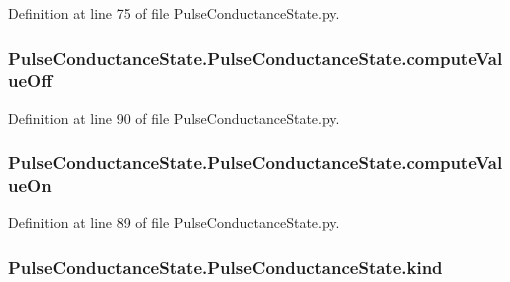 Definition at line 75 of file Pulse\-Conductance\-State.\-py.

\hypertarget{class_pulse_conductance_state_1_1_pulse_conductance_state_a89e0cc154bd699aee7529574a8fe556c}{
\subsubsection[{compute\-Value\-Off}]{\setlength{\rightskip}{0pt plus 5cm}Pulse\-Conductance\-State.\-Pulse\-Conductance\-State.\-compute\-Value\-Off}}\label{class_pulse_conductance_state_1_1_pulse_conductance_state_a89e0cc154bd699aee7529574a8fe556c}


Definition at line 90 of file Pulse\-Conductance\-State.\-py.

\hypertarget{class_pulse_conductance_state_1_1_pulse_conductance_state_a7f6710b9f97ac5879888402cd5ed15d4}{
\subsubsection[{compute\-Value\-On}]{\setlength{\rightskip}{0pt plus 5cm}Pulse\-Conductance\-State.\-Pulse\-Conductance\-State.\-compute\-Value\-On}}\label{class_pulse_conductance_state_1_1_pulse_conductance_state_a7f6710b9f97ac5879888402cd5ed15d4}


Definition at line 89 of file Pulse\-Conductance\-State.\-py.

\hypertarget{class_pulse_conductance_state_1_1_pulse_conductance_state_a53d237daaa4815ad375e2377da89845e}{
\subsubsection[{kind}]{\setlength{\rightskip}{0pt plus 5cm}Pulse\-Conductance\-State.\-Pulse\-Conductance\-State.\-kind}}\label{class_pulse_conductance_state_1_1_pulse_conductance_state_a53d237daaa4815ad375e2377da89845e}


